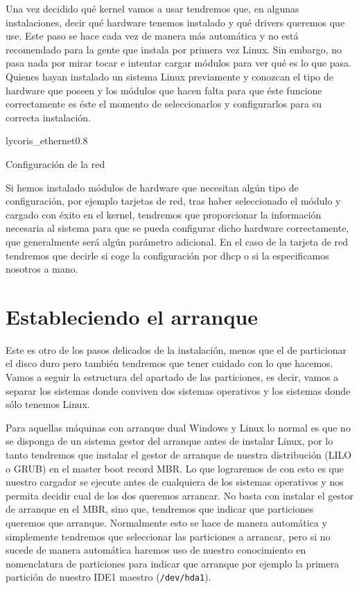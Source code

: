 Una vez  decidido qué kernel  vamos a  usar tendremos que,  en algunas
instalaciones,  decir qué  hardware  tenemos instalado  y qué  drivers
queremos que use. Este paso se  hace cada vez de manera más automática
y no está recomendado para la gente que instala por primera vez Linux.
Sin embargo, no pasa nada  por mirar  tocar e intentar  cargar módulos
para  ver qué  es lo  que pasa.  Quienes  hayan  instalado un  sistema
Linux previamente  y conozcan  el tipo  de hardware  que poseen  y los
módulos  que  hacen falta  para  que  éste funcione  correctamente  es
éste el  momento de  seleccionarlos y  configurarlos para  su correcta
instalación.

\begin{figura}{lycoris_ethernet}{0.8}
\caption{Configuración de la red}
\end{figura}


Si hemos  instalado módulos  de hardware que  necesitan algún  tipo de
configuración, por ejemplo tarjetas de red, tras haber seleccionado el
módulo y  cargado con éxito  en el kernel, tendremos  que proporcionar
la  información necesaria  al  sistema para  que  se pueda  configurar
dicho hardware  correctamente, que  generalmente será  algún parámetro
adicional. En  el caso de la  tarjeta de red tendremos  que decirle si
coge la configuración por dhcp o  si la especificamos nosotros a mano.

\section{Estableciendo el arranque}

Este es otro de los pasos delicados de la instalación, menos que el de
particionar el disco duro pero también tendremos que tener cuidado con
lo  que hacemos.  Vamos a  seguir la  estructura del  apartado de  las
particiones, es decir, vamos a separar los sistemas donde conviven dos
sistemas operativos y los sistemas donde sólo tenemos Linux.

Para aquellas máquinas con arranque dual  Windows y Linux lo normal es
que no se disponga de un sistema gestor del arranque antes de instalar
Linux, por  lo tanto tendremos que  instalar el gestor de  arranque de
nuestra distribución  (LILO o GRUB) en  el master boot record  MBR. Lo
que lograremos de con esto es que nuestro cargador se ejecute antes de
cualquiera de  los sistemas operativos  y nos permita decidir  cual de
los dos queremos arrancar. No basta con instalar el gestor de arranque
en el  MBR, sino que,  tendremos que indicar que  particiones queremos
que  arranque.  Normalmente  esto  se  hace  de  manera  automática  y
simplemente tendremos que seleccionar las particiones a arrancar, pero
si no sucede de manera  automática haremos uso de nuestro conocimiento
en nomenclatura de  particiones para indicar que  arranque por ejemplo
la primera partición de nuestro IDE1 maestro ({\tt /dev/hda1}).

